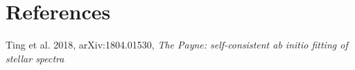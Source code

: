 \documentclass[12pt]{article}
\begin{document}
%
%
%
%

%

\section*{References}\vskip-0.2in
{\small
Ting et al. 2018, arXiv:1804.01530, \emph{The Payne: self-consistent ab initio fitting of stellar spectra}
}
\end{document}
